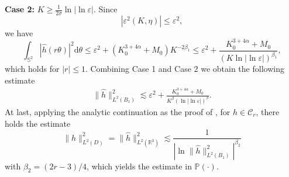 \documentclass[reqno, 12pt]{amsart}
\numberwithin{equation}{section}
\begin{document}
	\textbf{Case 2:} $K\geq \frac{1}{2\sigma}\ln|\ln \varepsilon|$. Since \[
    |\varepsilon^2(K,  \eta )|\le \varepsilon^2,
    \] we have
	\[
	\int_{\mathbb S^2}| \widehat{h}( r \theta)|^2\mathrm{d} \theta\le\varepsilon^2+(K_0^{3+4\alpha}+M_0)K^{-2\beta_1} \le \varepsilon^2+\frac{K_0^{3+4\alpha}+M_0}{(K\ln|\ln\varepsilon|)^{\beta_1}},
	\] which holds for $|r| \le 1.$
	Combining Case 1 and Case 2 we obtain the following estimate
	\begin{align}\label{inte}
		\|\hat h\|_{L^2(B_1)}^2
		\lesssim \varepsilon^2+\frac{K_0^{3+4\alpha}+M_0}{K^\beta(\ln|\ln \varepsilon|)^\beta}.
	\end{align}
    At last, applying the analytic continuation as the proof of \cite[Theorem 2.1]{Li2016increasing}, for $h \in \mathcal C_r$, there holds the estimate \begin{equation} \label{oute}
		\|h\|^2_{L^2(D)}=\|\hat{h}\|^2_{L^2(\mathbb{R}^3)} \lesssim \frac{1}{\left|\ln{\|\hat{h}\|_{L^2(B_1)}^2} \right|^{\beta_2}}
	\end{equation}
	with $\beta_2=(2r-3)/4$, which yields the estimate in $\mathbb P(\cdot)$.
	
\end{document}
